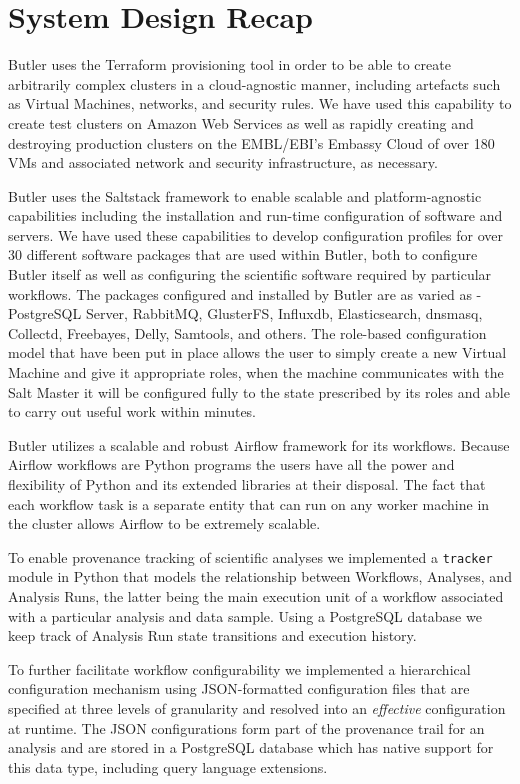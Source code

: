\section{System Design Recap}
Butler uses the Terraform provisioning tool in order to be able to create arbitrarily complex clusters in a cloud-agnostic manner, including artefacts such as Virtual Machines, networks, and security rules. We have used this capability to create test clusters on Amazon Web Services as well as rapidly creating and destroying production clusters on the EMBL/EBI's Embassy Cloud of over 180 VMs and associated network and security infrastructure, as necessary. 

Butler uses the Saltstack framework to enable scalable and platform-agnostic capabilities including the installation and run-time configuration of software and servers. We have used these capabilities to develop configuration profiles for over 30 different software packages that are used within Butler, both to configure Butler itself as well as configuring the scientific software required by particular workflows. The packages configured and installed by Butler are as varied as - PostgreSQL Server, RabbitMQ, GlusterFS, Influxdb, Elasticsearch, dnsmasq, Collectd, Freebayes, Delly, Samtools, and others. The role-based configuration model that have been put in place allows the user to simply create a new Virtual Machine and give it appropriate roles, when the machine communicates with the Salt Master it will be configured fully to the state prescribed by its roles and able to carry out useful work within minutes.

Butler utilizes a scalable and robust Airflow framework for its workflows. Because Airflow workflows are Python programs the users have all the power and flexibility of Python and its extended libraries at their disposal. The fact that each workflow task is a separate entity that can run on any worker machine in the cluster allows Airflow to be extremely scalable. 

To enable provenance tracking of scientific analyses we implemented a \texttt{tracker} module in Python that models the relationship between Workflows, Analyses, and Analysis Runs, the latter being the main execution unit of a workflow associated with a particular analysis and data sample. Using a PostgreSQL database we keep track of Analysis Run state transitions and execution history.

To further facilitate workflow configurability we implemented a hierarchical configuration mechanism using JSON-formatted configuration files that are specified at three levels of granularity and resolved into an \emph{effective} configuration at runtime. The JSON configurations form part of the provenance trail for an analysis and are stored in a PostgreSQL database which has native support for this data type, including query language extensions\autocite{lerner2014forge}.

